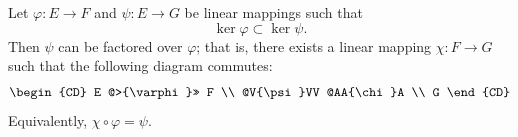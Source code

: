 Let $\varphi: E \to F$ and $\psi: E \to G$ be linear mappings such that
$$
\ker \varphi \subset \ker \psi.
$$
Then $\psi$ can be factored over $\varphi$; that is, there exists a linear mapping $\chi: F \to G$ such that the following diagram commutes:
$$
\begin{CD}
E @>{\varphi}>> F \\
@V{\psi}VV @AA{\chi}A \\
G
\end{CD}
$$
Equivalently, $\chi \circ \varphi = \psi$.
